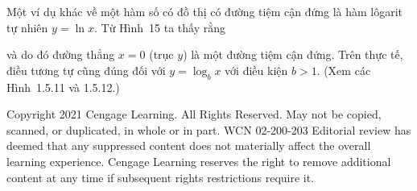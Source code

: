 \begin{minipage}[t]{0.69\textwidth}
    \vspace{10pt}
    Một ví dụ khác về một hàm số có đồ thị có đường tiệm cận đứng là hàm lôgarit tự nhiên $y = \ln x$. Từ Hình~15 ta thấy rằng
    \par\vspace{5pt}
    \begin{center}
    \end{center}
    \par\vspace{5pt}
    và do đó đường thẳng $x = 0$ (trục $y$) là một đường tiệm cận đứng. Trên thực tế, điều tương tự cũng đúng đối với $y = \log_b x$ với điều kiện $b > 1$. (Xem các Hình~1.5.11 và 1.5.12.)
\end{minipage}

\vfill
\begin{flushleft}
    \fontsize{6.5pt}{7.5pt}\selectfont\textcolor{gray!80}{%
    Copyright 2021 Cengage Learning. All Rights Reserved. May not be copied, scanned, or duplicated, in whole or in part. WCN 02-200-203\newline
    Editorial review has deemed that any suppressed content does not materially affect the overall learning experience. Cengage Learning reserves the right to remove additional content at any time if subsequent rights restrictions require it.}
\end{flushleft}
